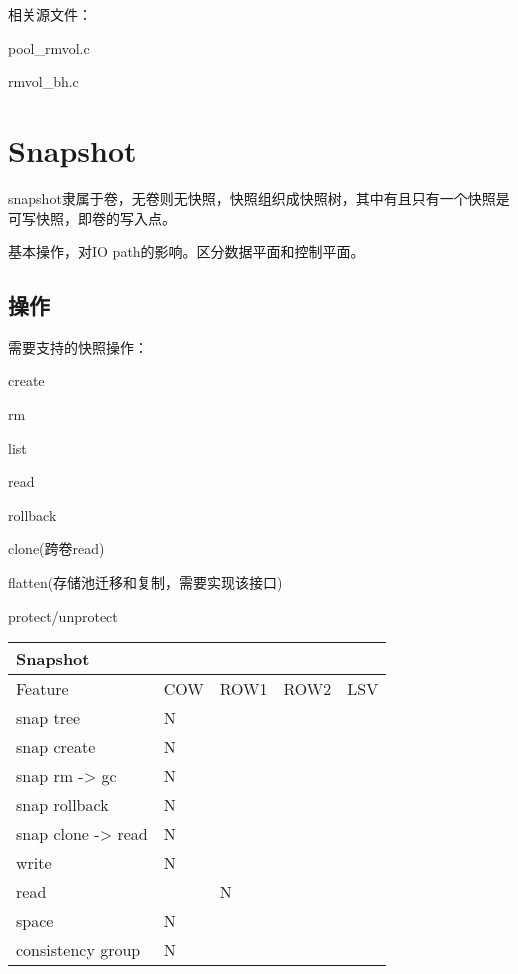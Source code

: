 相关源文件：
\begin{compactitem}
\item pool\_rmvol.c
\item rmvol\_bh.c
\end{compactitem}

\section{Snapshot}

snapshot隶属于卷，无卷则无快照，快照组织成快照树，其中有且只有一个快照是可写快照，即卷的写入点。

基本操作，对IO path的影响。区分数据平面和控制平面。

\subsection{操作}

需要支持的快照操作：
\begin{enumbox}
\item create
\item rm
\item list
\item read
\item rollback
\item clone(跨卷read)
\item flatten(存储池迁移和复制，需要实现该接口)
\item protect/unprotect
\end{enumbox}

\begin{tabular}{|s|p{0.6cm}|p{0.6cm}|p{0.6cm}|p{0.6cm}| }
    \hline
      {Snapshot} \\
    \hline
    Feature & COW & ROW1 & ROW2 & LSV \\
    \hline
    snap tree & N &  & & \\
    \hline
    snap create & N &  & & \\
    \hline
    snap rm -> gc & N &  & & \\
    \hline
    snap rollback & N &  & & \\
    \hline
    snap clone -> read & N & & & \\
    \hline
    write & N &  & & \\
    \hline
    read & & N & & \\
    \hline
    space & N &  & & \\
    \hline
    consistency group & N &  & & \\
    \hline
\end{tabular}

